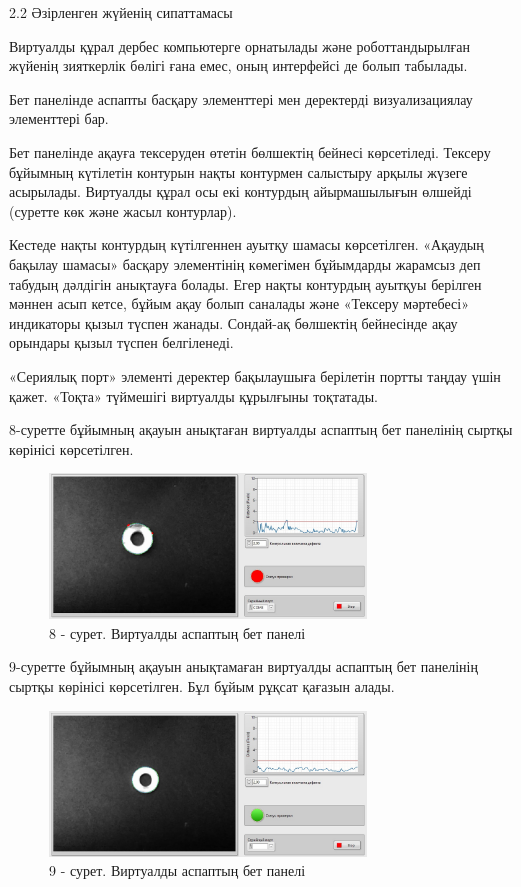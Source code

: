 \begin{multicols}{2}
2.2 Әзірленген жүйенің сипаттамасы

Виртуалды құрал дербес компьютерге орнатылады және роботтандырылған
жүйенің зияткерлік бөлігі ғана емес, оның интерфейсі де болып табылады.

Бет панелінде аспапты басқару элементтері мен деректерді визуализациялау
элементтері бар.

Бет панелінде ақауға тексеруден өтетін бөлшектің бейнесі көрсетіледі.
Тексеру бұйымның күтілетін контурын нақты контурмен салыстыру арқылы
жүзеге асырылады. Виртуалды құрал осы екі контурдың айырмашылығын
өлшейді (суретте көк және жасыл контурлар).

Кестеде нақты контурдың күтілгеннен ауытқу шамасы көрсетілген. «Ақаудың
бақылау шамасы» басқару элементінің көмегімен бұйымдарды жарамсыз деп
табудың дәлдігін анықтауға болады. Егер нақты контурдың ауытқуы берілген
мәннен асып кетсе, бұйым ақау болып саналады және «Тексеру мәртебесі»
индикаторы қызыл түспен жанады. Сондай-ақ бөлшектің бейнесінде ақау
орындары қызыл түспен белгіленеді.

«Сериялық порт» элементі деректер бақылаушыға берілетін портты таңдау
үшін қажет. «Тоқта» түймешігі виртуалды құрылғыны тоқтатады.

8-суретте бұйымның ақауын анықтаған виртуалды аспаптың бет панелінің
сыртқы көрінісі көрсетілген.
\end{multicols}

\begin{figure}[H]
	\centering
	\includegraphics[width=0.75\textwidth]{media/ict2/image176}
	\caption*{8 - сурет. Виртуалды аспаптың бет панелі}
\end{figure}

9-суретте бұйымның ақауын анықтамаған виртуалды аспаптың бет панелінің
сыртқы көрінісі көрсетілген. Бұл бұйым рұқсат қағазын алады.

\begin{figure}[H]
	\centering
	\includegraphics[width=0.75\textwidth]{media/ict2/image177}
	\caption*{9 - сурет. Виртуалды аспаптың бет панелі}
\end{figure}

